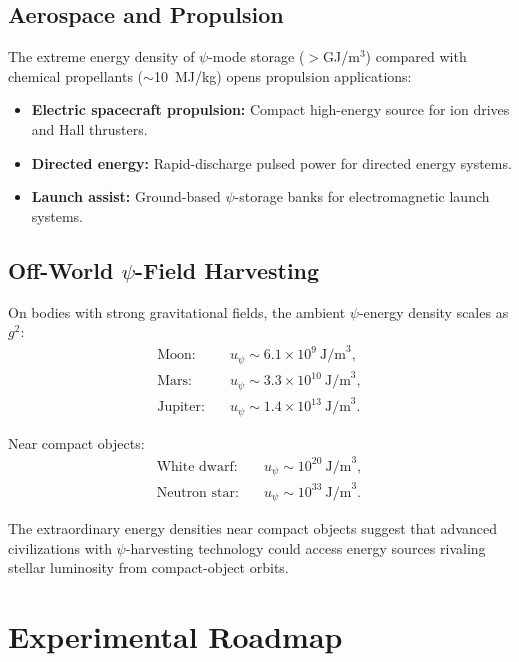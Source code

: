 \documentclass[aps,prd,twocolumn,showpacs,preprintnumbers,superscriptaddress,nofootinbib]{revtex4-2}
\begin{document}
\subsection{Aerospace and Propulsion}\label{sec:aerospace}

The extreme energy density of $\psi$-mode storage ($>$GJ/m$^3$)
compared with chemical propellants ($\sim$10~MJ/kg) opens propulsion
applications:
\begin{itemize}
\item \textbf{Electric spacecraft propulsion:} Compact high-energy
source for ion drives and Hall thrusters.
\item \textbf{Directed energy:} Rapid-discharge pulsed power for
directed energy systems.
\item \textbf{Launch assist:} Ground-based $\psi$-storage banks for
electromagnetic launch systems.
\end{itemize}

\subsection{Off-World $\psi$-Field Harvesting}\label{sec:offworld}

On bodies with strong gravitational fields, the ambient $\psi$-energy
density scales as $g^2$:
\begin{align}
\text{Moon:}\quad & u_\psi \sim 6.1\times 10^9~\text{J/m}^3, \\
\text{Mars:}\quad & u_\psi \sim 3.3\times 10^{10}~\text{J/m}^3, \\
\text{Jupiter:}\quad & u_\psi \sim 1.4\times 10^{13}~\text{J/m}^3.
\end{align}

Near compact objects:
\begin{align}
\text{White dwarf:}\quad & u_\psi \sim 10^{20}~\text{J/m}^3, \\
\text{Neutron star:}\quad & u_\psi \sim 10^{33}~\text{J/m}^3.
\end{align}

The extraordinary energy densities near compact objects suggest that
advanced civilizations with $\psi$-harvesting technology could access
energy sources rivaling stellar luminosity from compact-object orbits.

\section{Experimental Roadmap}\label{sec:roadmap}
\end{document}
